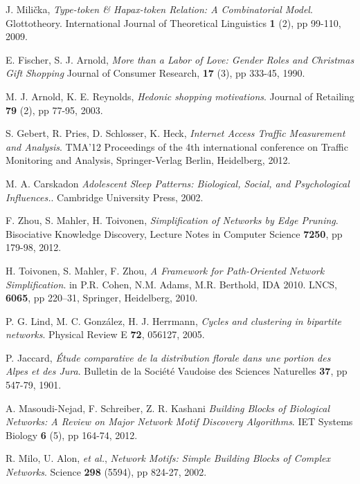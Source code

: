 \begin{thebibliography}{99}
  J. Milička,
  \emph{Type-token \& Hapax-token Relation: A Combinatorial Model}.
  Glottotheory. International Journal of Theoretical Linguistics \textbf{1} (2), pp 99-110,
  2009.
  
  E. Fischer, S. J. Arnold,
  \emph{More than a Labor of Love: Gender Roles and Christmas Gift Shopping}
  Journal of Consumer Research, \textbf{17} (3), pp 333-45,
  1990.

  M. J. Arnold, K. E. Reynolds,
  \emph{Hedonic shopping motivations}.
  Journal of Retailing \textbf{79} (2), pp 77-95,
  2003.

  S. Gebert, R. Pries, D. Schlosser, K. Heck,
  \emph{Internet Access Traffic Measurement and Analysis}.
  TMA'12 Proceedings of the 4th international conference on Traffic Monitoring and Analysis,
  Springer-Verlag Berlin, Heidelberg,
  2012.

  M. A. Carskadon
  \emph{Adolescent Sleep Patterns: Biological, Social, and Psychological Influences.}.
  Cambridge University Press,
  2002.

  F. Zhou, S. Mahler, H. Toivonen,
  \emph{Simplification of Networks by Edge Pruning}.
  Bisociative Knowledge Discovery,
  Lecture Notes in Computer Science \textbf{7250}, pp 179-98,
  2012.

  H. Toivonen, S. Mahler, F. Zhou,
  \emph{A Framework for Path-Oriented Network Simplification}.
  in P.R. Cohen, N.M. Adams, M.R. Berthold,
  IDA 2010. LNCS, \textbf{6065}, pp 220–31,
  Springer, Heidelberg,
  2010.

  P. G. Lind, M. C. González, H. J. Herrmann,
  \emph{Cycles and clustering in bipartite networks}.
  Physical Review E \textbf{72}, 056127,
  2005.

  P. Jaccard,
  \emph{Étude comparative de la distribution florale dans une portion des Alpes et des Jura}.
  Bulletin de la Société Vaudoise des Sciences Naturelles \textbf{37}, pp 547-79,
  1901.

  A. Masoudi-Nejad, F. Schreiber, Z. R. Kashani
  \emph{Building Blocks of Biological Networks: A Review on Major Network Motif Discovery Algorithms}.
  IET Systems Biology \textbf{6} (5), pp 164-74,
  2012.

  R. Milo, U. Alon, \textit{et al.},
  \emph{Network Motifs: Simple Building Blocks of Complex Networks}.
  Science \textbf{298} (5594), pp 824-27,
  2002.


\end{thebibliography}
